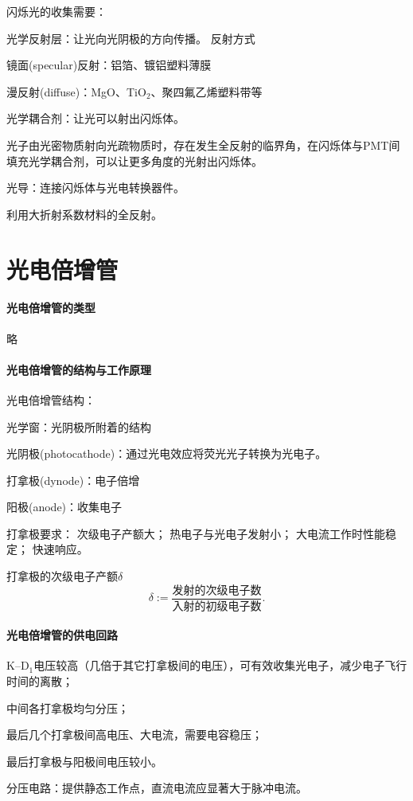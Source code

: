 闪烁光的收集需要：
\begin{compactitem}
	\item 光学反射层：让光向光阴极的方向传播。
	反射方式
	\begin{compactitem}
		\item 镜面(specular)反射：铝箔、镀铝塑料薄膜
		\item 漫反射(diffuse)：MgO、TiO$_2$、聚四氟乙烯塑料带等
	\end{compactitem}
	\item 光学耦合剂：让光可以射出闪烁体。
	
	光子由光密物质射向光疏物质时，存在发生全反射的临界角，在闪烁体与PMT间填充光学耦合剂，可以让更多角度的光射出闪烁体。
	\item 光导：连接闪烁体与光电转换器件。
	
	利用大折射系数材料的全反射。
\end{compactitem}

\section{光电倍增管}

\paragraph{光电倍增管的类型}略
\paragraph{光电倍增管的结构与工作原理}
光电倍增管结构：
\begin{compactenum}
	\item 光学窗：光阴极所附着的结构
	\item 光阴极(photocathode)：通过光电效应将荧光光子转换为光电子。%
	\item 打拿极(dynode)：电子倍增
	\item 阳极(anode)：收集电子
\end{compactenum}

打拿极要求：
次级电子产额大；
热电子与光电子发射小；
大电流工作时性能稳定；
快速响应。

打拿极的次级电子产额$\delta$
\begin{equation}\label{eq:nrd-dynode-secondary-yield}
	\delta := \frac{\text{发射的次级电子数}}{\text{入射的初级电子数}}.
\end{equation}

\paragraph{光电倍增管的供电回路}
\begin{compactenum}
	\item K--D$_1$电压较高（几倍于其它打拿极间的电压），可有效收集光电子，减少电子飞行时间的离散；
	\item 中间各打拿极均匀分压；
	\item 最后几个打拿极间高电压、大电流，需要电容稳压；
	\item 最后打拿极与阳极间电压较小。
\end{compactenum}
分压电路：提供静态工作点，直流电流应显著大于脉冲电流。

